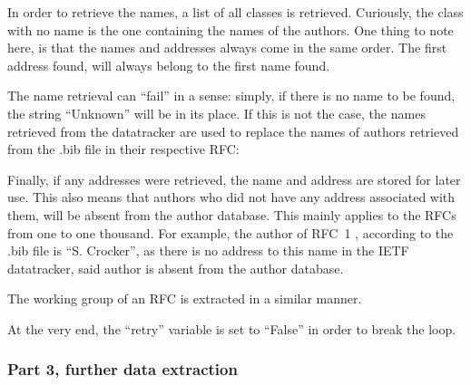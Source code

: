 \documentclass[a4paper,english]{report}
\begin{document}
In order to retrieve the names, a list of all classes is retrieved. Curiously, the class with no name is the one containing the names of the authors. One thing to note here, is that the names and addresses always come in the same order. The first address found, will always belong to the first name found.\\

\smallskip

\smallskip

The name retrieval can “fail” in a sense: simply, if there is no name to be found, the string “Unknown” will be in its place. If this is not the case, the names retrieved from the datatracker are used to replace the names of authors retrieved from the .bib file in their respective RFC: 
\smallskip

\smallskip
Finally, if any addresses were retrieved, the name and address are stored for later use. This also means that authors who did not have any address associated with them, will be absent from the author database. This mainly applies to the RFCs from one to one thousand.
For example, the author of RFC~1 \cite{RFC0001}, according to the .bib file is “S. Crocker”, as there is no address to this name in the IETF datatracker, said author is absent from the author database. 

\smallskip

\smallskip

The working group of an RFC is extracted in a similar manner.




At the very end, the “retry” variable is set to “False” in order to break the loop.


\subsubsection{Part 3, further data extraction}
\end{document}

